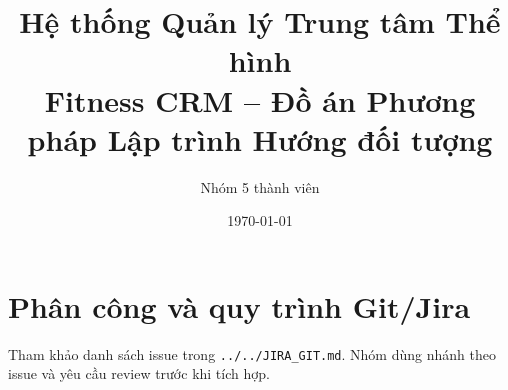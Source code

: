 \documentclass[12pt,a4paper]{report}
\title{Hệ thống Quản lý Trung tâm Thể hình\\\large Fitness CRM -- Đồ án Phương pháp Lập trình Hướng đối tượng}
\author{Nhóm 5 thành viên}
\date{\today}
\begin{document}
\maketitle
{}
\tableofcontents
\listoffigures
\clearpage
{}








\appendix
\chapter{Phân công và quy trình Git/Jira}
Tham khảo danh sách issue trong \texttt{../../JIRA_GIT.md}. Nhóm dùng nhánh theo issue và yêu cầu review trước khi tích hợp.
\end{document}

